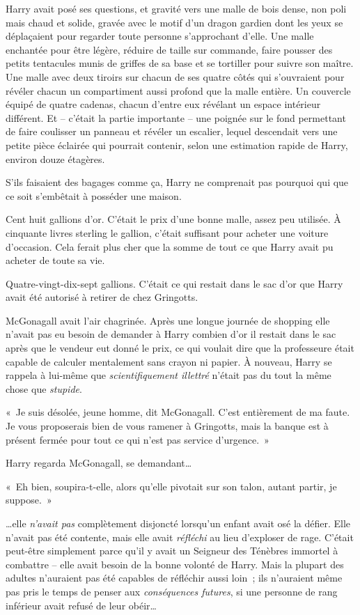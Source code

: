 Harry avait posé ses questions, et gravité vers une malle de bois dense, non poli mais chaud et solide, gravée avec le motif d'un dragon gardien dont les yeux se déplaçaient pour regarder toute personne s'approchant d'elle.
Une malle enchantée pour être légère, réduire de taille sur commande, faire pousser des petits tentacules munis de griffes de sa base et se tortiller pour suivre son maître.
Une malle avec deux tiroirs sur chacun de ses quatre côtés qui s'ouvraient pour révéler chacun un compartiment aussi profond que la malle entière.
Un couvercle équipé de quatre cadenas, chacun d'entre eux révélant un espace intérieur différent.
Et -- c'était la partie importante -- une poignée sur le fond permettant de faire coulisser un panneau et révéler un escalier, lequel descendait vers une petite pièce éclairée qui pourrait contenir, selon une estimation rapide de Harry, environ douze étagères.

S'ils faisaient des bagages comme ça, Harry ne comprenait pas pourquoi qui que ce soit s'embêtait à posséder une maison.

Cent huit gallions d'or. C'était le prix d'une bonne malle, assez peu utilisée.
À cinquante livres sterling le gallion, c'était suffisant pour acheter une voiture d'occasion.
Cela ferait plus cher que la somme de tout ce que Harry avait pu acheter de toute sa vie.

Quatre-vingt-dix-sept gallions. C'était ce qui restait dans le sac d'or que Harry avait été autorisé à retirer de chez Gringotts.

McGonagall avait l'air chagrinée.
Après une longue journée de shopping elle n'avait pas eu besoin de demander à Harry combien d'or il restait dans le sac après que le vendeur eut donné le prix, ce qui voulait dire que la professeure était capable de calculer mentalement sans crayon ni papier.
À nouveau, Harry se rappela à lui-même que \emph{scientifiquement illettré} n'était pas du tout la même chose que \emph{stupide}.

«~Je suis désolée, jeune homme, dit McGonagall. C'est entièrement de ma faute. Je vous proposerais bien de vous ramener à Gringotts, mais la banque est à présent fermée pour tout ce qui n'est pas service d'urgence.~»

Harry regarda McGonagall, se demandant…

«~Eh bien, soupira-t-elle, alors qu'elle pivotait sur son talon, autant partir, je suppose.~»

…elle \emph{n'avait pas} complètement disjoncté lorsqu'un enfant avait osé la défier.
Elle n'avait pas été contente, mais elle avait \emph{réfléchi} au lieu d'exploser de rage.
C'était peut-être simplement parce qu'il y avait un Seigneur des Ténèbres immortel à combattre -- elle avait besoin de la bonne volonté de Harry.
Mais la plupart des adultes n'auraient pas été capables de réfléchir aussi loin~;
ils n'auraient même pas pris le temps de penser aux \emph{conséquences futures}, si une personne de rang inférieur avait refusé de leur obéir…

